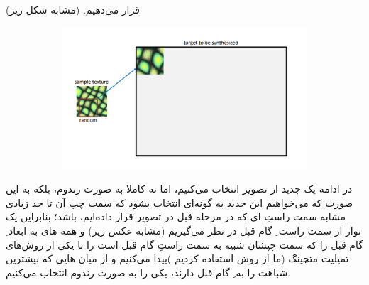 \documentclass[a4paper,12pt]{article}
\begin{document}
قرار می‌دهیم. (مشابه شکل زیر)
\begin{figure}[H]
	\centering
	\begin{subfigure}{0.8\textwidth}
		\centering
		\includegraphics[width=.7\textwidth]{2.png}
	\end{subfigure}
\end{figure}
در ادامه یک 
جدید  از تصویر 
انتخاب می‌کنیم، اما نه کاملا به صورت رندوم، بلکه به این صورت که می‌خواهیم این 
جدید به گونه‌ای انتخاب بشود که سمت چپ آن تا حد زیادی مشابه سمت راستِ
‌ای
که در مرحله قبل در تصویر 
قرار داده‌ایم، باشد؛ بنابراین یک نوار از سمت راست 
 ِ
 گام قبل در نظر می‌گیریم (مشابه عکس زیر) و همه 
 ‌های
 به ابعاد 
 ِ
 گام قبل را که سمت چپشان شبیه به سمت راستِ 
 گام قبل است را با یکی از روش‌های تمپلیت متچینگ (‌ما از روش 
 استفاده کردیم
 )پیدا می‌کنیم و از میان 
 هایی که بیشترین شباهت را به 
 ِ
 گام قبل دارند، یکی را به صورت رندوم انتخاب می‌کنیم.
\end{document}
